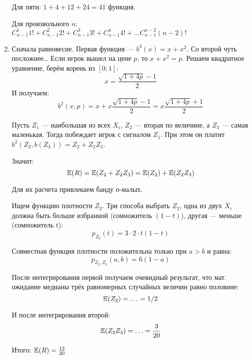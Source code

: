 \begin{enumerate}
Для пяти: $1+4+12+24=41$ функция.

Для произвольного $ n $: $ C_{n-1}^{1}1!+C_{n-1}^{2}2!+C_{n-1}^{3}3!+C_{n-1}^{4}4!+\ldots C_{n-1}^{n-2}(n-2)! $


\item Сначала равновесие. Первая функция — $ b^{3}(x)=x+x^{2} $. Со второй чуть посложнее\ldots
Если игрок вышел на цене $ p $, то $ x+x^{2}=p $. Решаем квадратное уравнение, берём корень из $ [0;1] $:
\begin{equation}
x=\frac{\sqrt{1+4p}-1}{2}
\end{equation}
И получаем:
\begin{equation}
b^{2}(x,p)=x+x\frac{\sqrt{1+4p}-1}{2}=x\frac{\sqrt{1+4p}+1}{2}
\end{equation}

Пусть $ Z_{1} $ — наибольшая из всех $ X_{i} $, $ Z_{2} $ — вторая по величине, а $ Z_{3} $ — самая маленькая. Тогда побеждает игрок с сигналом $ Z_{1} $. При этом он платит $ b^{2}(Z_{2},b(Z_{3}))=Z_{2}+Z_{2}Z_{3} $.

Значит:
\begin{equation}
\mathbb{E}(R)=\mathbb{E}(Z_{2}+Z_{2}Z_{3})=\mathbb{E}(Z_{2})+\mathbb{E}(Z_{2}Z_{3})
\end{equation}

Для их расчета привлекаем банду о-малых.


Ищем функцию плотности $ Z_{2} $. Три способа выбрать $ Z_{2} $, одна из двух $ X_{i} $ должна быть больше избранной (сомножитель $ (1-t) $), другая — меньше (сомножитель $ t $):
\begin{equation}
p_{Z_{2}}(t)=3\cdot 2\cdot t(1-t)
\end{equation}

Совместная функция плотности положительна только при $ a>b $ и равна:
\begin{equation}
p_{Z_{2},Z_{3}}(a,b)=6(1-a)
\end{equation}

После интегрирования первой получаем очевидный результат, что мат. ожидание медианы трёх равномерных случайных величин равно половине:
\begin{equation}
\mathbb{E}(Z_{2})=\ldots=1/2
\end{equation}

И после интегрирования второй:
\begin{equation}
\mathbb{E}(Z_{2}Z_{3})=\ldots=\frac{3}{20}
\end{equation}

Итого: $ \mathbb{E}(R)=\frac{13}{20} $


\end{enumerate}
